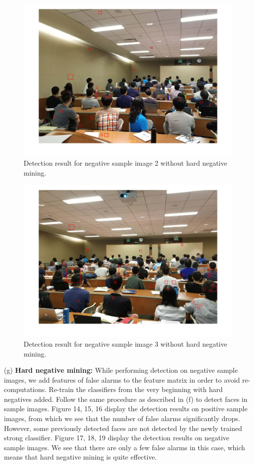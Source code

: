 \documentclass[10pt]{article}
\begin{document}
	\newpage\begin{figure}[ht]
		\includegraphics[width=\textwidth]{detection_nonface_2.jpg}
		\centering
		\caption{Detection result for negative sample image 2 without hard negative mining.}
		\label{12}
	\end{figure}
	\newpage\begin{figure}[ht]
		\includegraphics[width=\textwidth]{detection_nonface_3.jpg}
		\centering
		\caption{Detection result for negative sample image 3 without hard negative mining.}
		\label{13}
	\end{figure}
	(g) \textbf{Hard negative mining:} While performing detection on negative sample images, we add features of false alarms to the feature matrix in order to avoid re-computations. Re-train the classifiers from the very beginning with hard negatives added. Follow the same procedure as described in (f) to detect faces in sample images. Figure 14, 15, 16 display the detection results on positive sample images, from which we see that the number of false alarms significantly drops. However, some previously detected faces are not detected by the newly trained strong classifier. Figure 17, 18, 19 display the detection results on negative sample images. We see that there are only a few false alarms in this case, which means that hard negative mining is quite effective. \\
\end{document}
